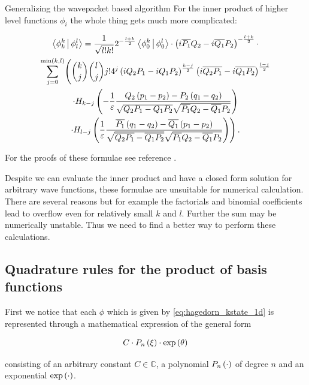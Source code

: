 \begin{chapter}{Generalizing the wavepacket based algorithm}
For the inner product of higher level functions $\phi_i$ the whole thing gets much
more complicated:

\begin{multline}
  \Braket{ \phi_k^k | \phi_l^l } =
  \frac{1}{\sqrt{l!k!}} 2^{-\frac{l+k}{2}} \Braket{ \phi_0^k | \phi_0^l } \cdot
  \left(i \overline{ P_1} Q_2 - i \overline{Q_1} P_2\right)^{-\frac{l+k}{2}} \cdot \\
  \sum_{j=0}^{\min\left(k,l\right)}
    \Biggl(
      \binom{k}{j} \binom{l}{j} j! 4^j
      \left(i Q_2  P_1 - i Q_1  P_2\right)^{\frac{k-j}{2}}
      \left(i \overline{Q_2 P_1} - i\overline{Q_1 P_2}\right)^{\frac{l-j}{2}}
      \\
      \cdot H_{k-j}\left(-\frac{1}{\varepsilon}
                    \frac{Q_2\left(p_1-p_2\right)-P_2\left(q_1-q_2\right)}
                         {\sqrt{Q_2 P_1 - Q_1 P_2}\sqrt{\overline{P_1}Q_2-\overline{Q_1} P_2}}\right)
      \\
      \cdot H_{l-j}\left(\frac{1}{\varepsilon}
                   \frac{\overline{ P_1}\left(q_1-q_2\right)-\overline{Q_1}\left(p_1-p_2\right)}
                        {\sqrt{\overline{Q_2 P_1}-\overline{Q_1 P_2}}\sqrt{\overline{ P_1}Q_2-\overline{Q_1} P_2}}\right)
    \Biggr) \,.
\end{multline}

For the proofs of these formulae see reference \cite{H_R_quantization_rules}.

Despite we can evaluate the inner product and have a closed form solution for arbitrary
wave functions, these formulae are unsuitable for numerical calculation. There are
several reasons but for example the factorials and binomial coefficients lead to
overflow even for relatively small $k$ and $l$. Further the sum may be numerically
unstable. Thus we need to find a better way to perform these calculations.

\subsection{Quadrature rules for the product of basis functions}

First we notice that each $\phi$ which is given by \eqref{eq:hagedorn_kstate_1d}
is represented through a mathematical expression of the general form

\begin{equation} \label{eq:expression_format}
  C \cdot P_n\left( \xi \right) \cdot \exp \left( \theta \right)
\end{equation}

consisting of an arbitrary constant $C \in \mathbb{C}$, a polynomial $P_n\left( \cdot \right)$
of degree $n$ and an exponential $\exp\left( \cdot \right)$.


\end{chapter}
